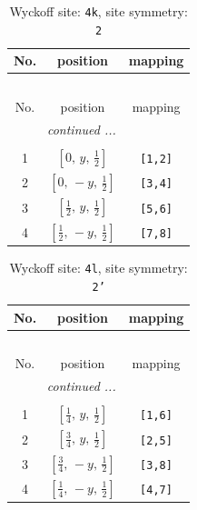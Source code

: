\documentclass[fleqn,8pt]{jsarticle}
\begin{document}
\renewcommand{\arraystretch}{1.2}
\begin{longtable}{ccc}
\caption{Wyckoff site: {\tt 4k}, site symmetry: {\tt 2}}
 \\
 \hline \hline
No. & position & mapping \\ \hline \endfirsthead

\multicolumn{2}{l}{\tablename\ \thetable{}} \\
 \hline \hline
No. & position & mapping \\ \hline \endhead

 \hline \hline
\multicolumn{2}{r}{\footnotesize\it continued ...} \\ \endfoot

 \hline \hline
\multicolumn{2}{r}{} \\ \endlastfoot

1 & $\left[ 0,\, y,\, \frac{1}{2} \right]$ & {\tt [1,2]} \\ \hline
2 & $\left[ 0,\, - y,\, \frac{1}{2} \right]$ & {\tt [3,4]} \\ \hline
3 & $\left[ \frac{1}{2},\, y,\, \frac{1}{2} \right]$ & {\tt [5,6]} \\ \hline
4 & $\left[ \frac{1}{2},\, - y,\, \frac{1}{2} \right]$ & {\tt [7,8]} \\
\end{longtable}
\renewcommand{\arraystretch}{1.2}
\begin{longtable}{ccc}
\caption{Wyckoff site: {\tt 4l}, site symmetry: {\tt 2'}}
 \\
 \hline \hline
No. & position & mapping \\ \hline \endfirsthead

\multicolumn{2}{l}{\tablename\ \thetable{}} \\
 \hline \hline
No. & position & mapping \\ \hline \endhead

 \hline \hline
\multicolumn{2}{r}{\footnotesize\it continued ...} \\ \endfoot

 \hline \hline
\multicolumn{2}{r}{} \\ \endlastfoot

1 & $\left[ \frac{1}{4},\, y,\, \frac{1}{2} \right]$ & {\tt [1,6]} \\ \hline
2 & $\left[ \frac{3}{4},\, y,\, \frac{1}{2} \right]$ & {\tt [2,5]} \\ \hline
3 & $\left[ \frac{3}{4},\, - y,\, \frac{1}{2} \right]$ & {\tt [3,8]} \\ \hline
4 & $\left[ \frac{1}{4},\, - y,\, \frac{1}{2} \right]$ & {\tt [4,7]} \\
\end{longtable}
\end{document}
